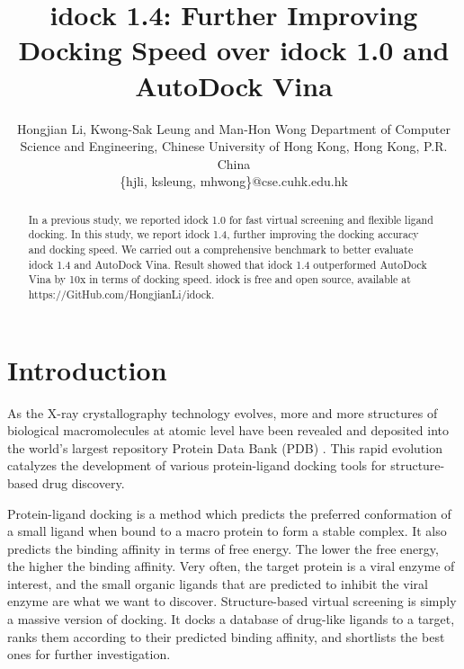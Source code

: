 \documentclass[10pt,conference,compsocconf]{../IEEEtran}
\begin{document}
\title{idock 1.4: Further Improving Docking Speed over idock 1.0 and AutoDock Vina} %
\author
{
\IEEEauthorblockN
{
Hongjian Li, Kwong-Sak Leung and Man-Hon Wong
\IEEEauthorblockA
{
Department of Computer Science and Engineering, Chinese University of Hong Kong, Hong Kong, P.R. China\\
\{hjli, ksleung, mhwong\}@cse.cuhk.edu.hk
}
}
}
\maketitle

\begin{abstract}

In a previous study, we reported idock 1.0 for fast virtual screening and flexible ligand docking. In this study, we report idock 1.4, further improving the docking accuracy and docking speed. We carried out a comprehensive benchmark to better evaluate idock 1.4 and AutoDock Vina. Result showed that idock 1.4 outperformed AutoDock Vina by 10x in terms of docking speed. idock is free and open source, available at https://GitHub.com/HongjianLi/idock.

\end{abstract}

\section{Introduction}

As the X-ray crystallography technology evolves, more and more structures of biological macromolecules at atomic level have been revealed and deposited into the world's largest repository Protein Data Bank (PDB) \cite{539,537}. This rapid evolution catalyzes the development of various protein-ligand docking tools for structure-based drug discovery.

Protein-ligand docking is a method which predicts the preferred conformation of a small ligand when bound to a macro protein to form a stable complex. It also predicts the binding affinity in terms of free energy. The lower the free energy, the higher the binding affinity. Very often, the target protein is a viral enzyme of interest, and the small organic ligands that are predicted to inhibit the viral enzyme are what we want to discover. Structure-based virtual screening is simply a massive version of docking. It docks a database of drug-like ligands to a target, ranks them according to their predicted binding affinity, and shortlists the best ones for further investigation.
\end{document}
